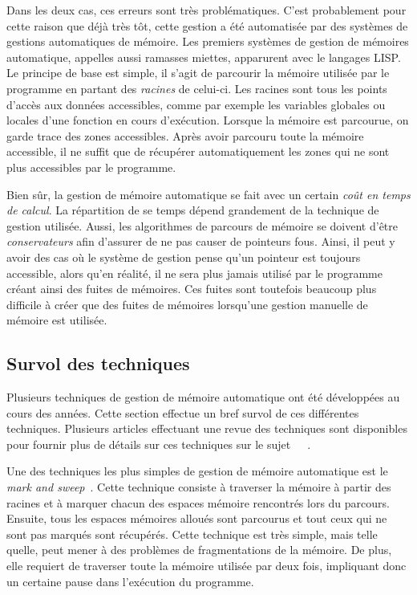 \documentclass[12pt,oneside,letterpaper,francais]{book}
\begin{document}
Dans les deux cas, ces erreurs sont très problématiques. C'est
probablement pour cette raison que déjà très tôt, cette gestion a été
automatisée par des systèmes de gestions automatiques de mémoire. Les
premiers systèmes de gestion de mémoires automatique, appelles aussi
ramasses miettes, apparurent avec le langages LISP. Le principe de
base est simple, il s'agit de parcourir la mémoire utilisée par le
programme en partant des \emph{racines} de celui-ci. Les racines sont
tous les points d'accès aux données accessibles, comme par exemple les
variables globales ou locales d'une fonction en cours
d'exécution. Lorsque la mémoire est parcourue, on garde trace des
zones accessibles. Après avoir parcouru toute la mémoire accessible,
il ne suffit que de récupérer automatiquement les zones qui ne sont
plus accessibles par le programme.

Bien sûr, la gestion de mémoire automatique se fait avec un certain
\emph{coût en temps de calcul}. La répartition de se temps dépend
grandement de la technique de gestion utilisée. Aussi, les algorithmes
de parcours de mémoire se doivent d'être \emph{conservateurs} afin
d'assurer de ne pas causer de pointeurs fous. Ainsi, il peut y avoir
des cas où le système de gestion pense qu'un pointeur est toujours
accessible, alors qu'en réalité, il ne sera plus jamais utilisé par le
programme créant ainsi des fuites de mémoires. Ces fuites sont
toutefois beaucoup plus difficile à créer que des fuites de mémoires
lorsqu'une gestion manuelle de mémoire est utilisée.


\subsection{Survol des techniques}
Plusieurs techniques de gestion de mémoire automatique ont été
développées au cours des années. Cette section effectue un bref survol
de ces différentes techniques. Plusieurs articles effectuant une revue
des techniques sont disponibles pour fournir plus de détails sur ces
techniques sur le
sujet~\cite{GC_REVIEW1}~\cite{GC_REVIEW2}~\cite{GC_REVIEW3}. 

Une des techniques les plus simples de gestion de mémoire automatique
est le \textit{mark and sweep}~\cite{LISP_ORIGINS}. Cette technique
consiste à traverser la mémoire à partir des racines et à marquer
chacun des espaces mémoire rencontrés lors du parcours. Ensuite, tous
les espaces mémoires alloués sont parcourus et tout ceux qui ne sont
pas marqués sont récupérés. Cette technique est très simple, mais
telle quelle, peut mener à des problèmes de fragmentations de la
mémoire. De plus, elle requiert de traverser toute la mémoire utilisée
par deux fois, impliquant donc un certaine pause dans l'exécution du
programme.
\end{document}
